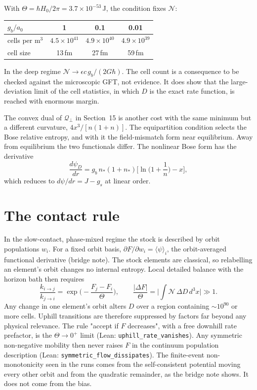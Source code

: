 With $\Theta=\hbar H_0/2\pi=3.7\times10^{-53}$\,J, the condition fixes $\mathcal N$:
\begin{center}\small
\begin{tabular}{lccc}\toprule
$g_b/a_0$ & 1 & 0.1 & 0.01\\\midrule
cells per m$^3$ & $4.5\times10^{41}$ & $4.9\times10^{40}$ & $4.9\times10^{39}$\\
cell size & 13\,fm & 27\,fm & 59\,fm\\\bottomrule
\end{tabular}\end{center}
In the deep regime $\mathcal N\to\epsilon c\,g_b/(2G\hbar)$. The cell count is a consequence to be checked against the microscopic GFT, not evidence. It does show that the large-deviation limit of the cell statistics, in which $D$ is the exact rate function, is reached with enormous margin.

The convex dual of $\mathcal Q_\perp$ in Section~15 is another cost with the same minimum but a different curvature, $4x^3/[n(1+n)]$. The equipartition condition selects the Bose relative entropy, and with it the field-mismatch form near equilibrium. Away from equilibrium the two functionals differ. The nonlinear Bose form has the derivative
\[
\frac{d\psi_D}{dr}=g_b\,n_*(1+n_*)\Big[\ln\Big(1+\frac1n\Big)-x\Big],
\]
which reduces to $d\psi/dr=J-g_s$ at linear order.

\section{The contact rule}
In the slow-contact, phase-mixed regime the stock is described by orbit populations $w_i$. For a fixed orbit basis, $\partial F/\partial w_i=\langle\psi\rangle_i$, the orbit-averaged functional derivative (bridge note). The stock elements are classical, so relabelling an element's orbit changes no internal entropy. Local detailed balance with the horizon bath then requires
\[
\frac{k_{i\to j}}{k_{j\to i}}=\exp\!\Big(-\frac{F_j-F_i}{\Theta}\Big),
\qquad \frac{|\Delta F|}{\Theta}=\Big|\int\mathcal N\,\Delta D\,d^3x\Big|\gg1 .
\]
Any change in one element's orbit alters $D$ over a region containing $\sim10^{90}$ or more cells. Uphill transitions are therefore suppressed by factors far beyond any physical relevance. The rule "accept if $F$ decreases", with a free downhill rate prefactor, is the $\Theta\to0^+$ limit (Lean: \texttt{uphill\_rate\_vanishes}). Any symmetric non-negative mobility then never raises $F$ in the continuum population description (Lean: \texttt{symmetric\_flow\_dissipates}). The finite-event non-monotonicity seen in the runs comes from the self-consistent potential moving every other orbit and from the quadratic remainder, as the bridge note shows. It does not come from the bias.

